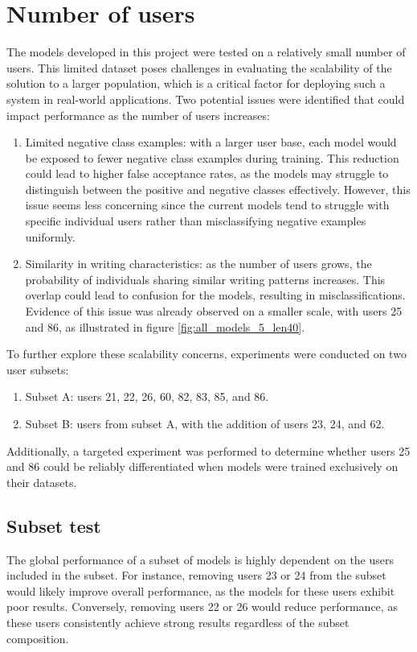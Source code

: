 \section{Number of users}
The models developed in this project were tested on a relatively small number of users. This limited dataset poses challenges in evaluating the scalability of the solution to a larger population, which is a critical factor for deploying such a system in real-world applications. Two potential issues were identified that could impact performance as the number of users increases:
\begin{enumerate}
	\item Limited negative class examples: with a larger user base, each model would be exposed to fewer negative class examples during training. This reduction could lead to higher false acceptance rates, as the models may struggle to distinguish between the positive and negative classes effectively.  However, this issue seems less concerning since the current models tend to struggle with specific individual users rather than misclassifying negative examples uniformly.
	
	\item Similarity in writing characteristics: as the number of users grows, the probability of individuals sharing similar writing patterns increases. This overlap could lead to confusion for the models, resulting in misclassifications. Evidence of this issue was already observed on a smaller scale, with users 25 and 86, as illustrated in figure \ref{fig:all_models_5_len40}.
\end{enumerate}

To further explore these scalability concerns, experiments were conducted on two user subsets:
\begin{enumerate}
	\item Subset A: users 21, 22, 26, 60, 82, 83, 85, and 86.
	\item Subset B: users from subset A, with the addition of users 23, 24, and 62.
\end{enumerate}

Additionally, a targeted experiment was performed to determine whether users 25 and 86 could be reliably differentiated when models were trained exclusively on their datasets.

\subsection{Subset test}
The global performance of a subset of models is highly dependent on the users included in the subset. For instance, removing users 23 or 24 from the subset would likely improve overall performance, as the models for these users exhibit poor results. Conversely, removing users 22 or 26 would reduce performance, as these users consistently achieve strong results regardless of the subset composition.

